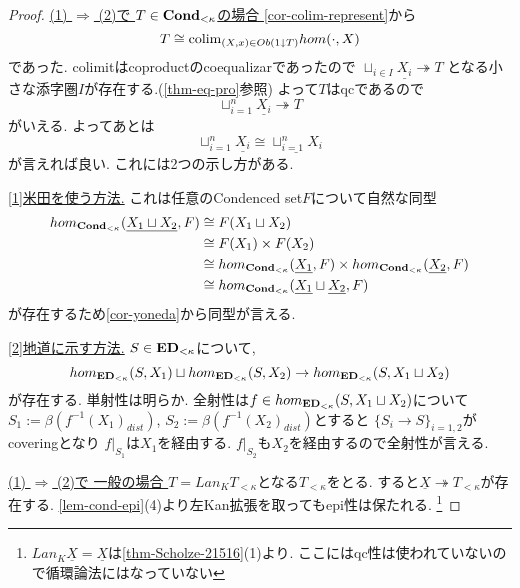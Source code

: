 \documentclass[dvipdfmx,a4paper,11pt]{article}
\newcommand{\colim}{{\rm colim}}
\theoremstyle{definition}
\begin{document}
 \begin{proof}

\underline{ (1) $\Rightarrow$ (2)で $T \in {\bf Cond}_{< \kappa}$の場合 }
\ref{cor-colim-represent}から
 $$
 T \cong  \colim_{(X,x) \in Ob(1 \downarrow T)} hom(\cdot, X)
 $$
 であった.
 colimitはcoproductのcoequalizarであったので
 $\sqcup_{i \in I}\underline{X_i} \twoheadrightarrow T $
 となる小さな添字圏$I$が存在する.(\ref{thm-eq-pro}参照)
よって$T$はqcであるので
$$
\sqcup_{i=1}^{n}\underline{X_i} \twoheadrightarrow T 
$$ 
がいえる.
よってあとは
$$
\sqcup_{i=1}^{n}\underline{X_i}
\cong 
\underline{\sqcup_{i=1}^{n} X_i}
$$
が言えれば良い.
これには2つの示し方がある. 

\underline{[1]米田を使う方法.} これは任意のCondenced set$F$について自然な同型
\begin{align*}
\begin{split}
hom_{{\bf Cond}_{< \kappa}}(\underline{X_1 \sqcup X_2}, F)
& \cong  F(X_1 \sqcup X_2) \\
& \cong F(X_1) \times F(X_2) \\
& \cong hom_{{\bf Cond}_{< \kappa}} (\underline{X_1}, F)\times hom_{{\bf Cond}_{< \kappa}}(\underline{X_2}, F) \\
& \cong hom_{{\bf Cond}_{< \kappa}}(\underline{X_1}\sqcup \underline{X_2}, F) \\
\end{split}
\end{align*}
が存在するため\ref{cor-yoneda}から同型が言える. 

\underline{[2]地道に示す方法.} $S \in {\bf ED}_{<\kappa}$について, 
$$
hom_{{\bf ED}_{< \kappa}}(S, X_1) \sqcup hom_{{\bf ED}_{< \kappa}}(S, X_2) \to  hom_{{\bf ED}_{< \kappa}}(S, X_1 \sqcup X_2)
$$
が存在する. 単射性は明らか. 
全射性は$f \in hom_{{\bf ED}_{< \kappa}}(S, X_1 \sqcup X_2)$について$S_1 := \beta(f^{-1}(X_1)_{dist})$, $S_2 := \beta(f^{-1}(X_2)_{dist})$とすると
$\{S_i \to S\}_{i=1,2}$がcoveringとなり
$f|_{S_{1}}$は$X_1$を経由する. $f|_{S_{2}}$も$X_2$を経由するので全射性が言える.

\underline{(1) $\Rightarrow$ (2)で 一般の場合 }
$T = Lan_{K}T_{< \kappa}$となる$T_{< \kappa}$をとる.
すると$\underline{X} \twoheadrightarrow T_{< \kappa}$が存在する.
\ref{lem-cond-epi}(4)より左Kan拡張を取ってもepi性は保たれる. 
\footnote{$Lan_{K}\underline{X}=\underline{X}$は\ref{thm-Scholze-21516}(1)より. ここにはqc性は使われていないので循環論法にはなっていない}


\end{proof}
\end{document}
